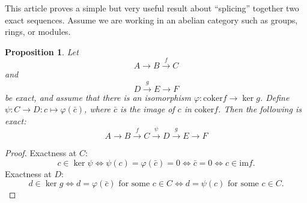\documentclass[12pt]{article}
\newcommand{\coker}{\mathrm{coker}}
\newcommand{\im}{\mathrm{im}}
\theoremstyle{plain} %
\newtheorem{prop}[thm]{Proposition}
\begin{document}
This article proves a simple but very useful result about ``splicing'' together two exact sequences. Assume we are working in an abelian category such as groups, rings, or modules.

\begin{prop} Let
\[
  A \to B \xrightarrow{f} C
\]
and
\[
  D \xrightarrow{g} E \to F
\]
be exact, and assume that there is an isomorphism $\varphi : \coker f \to \ker g$. Define $\psi : C\to D: c\mapsto \varphi(\bar{c})$, where $\bar{c}$ is the image of $c$ in $\coker f$. Then the following is exact:
\[
  A \to B \xrightarrow{f} C \xrightarrow{\psi} D \xrightarrow{g} E \to F
\]
\end{prop}
\begin{proof} Exactness at $C$:
\[
  c\in \ker \psi \iff \psi(c) = \varphi(\bar{c})=0 \iff \bar{c} = 0 \iff c\in\im f.
\]
Exactness at $D$:
\[
  d\in \ker g \iff d = \varphi(\bar{c}) \text{ for some } c\in C \iff d = \psi(c)\text{ for some } c\in C.
\]

\end{proof}

\end{document}
